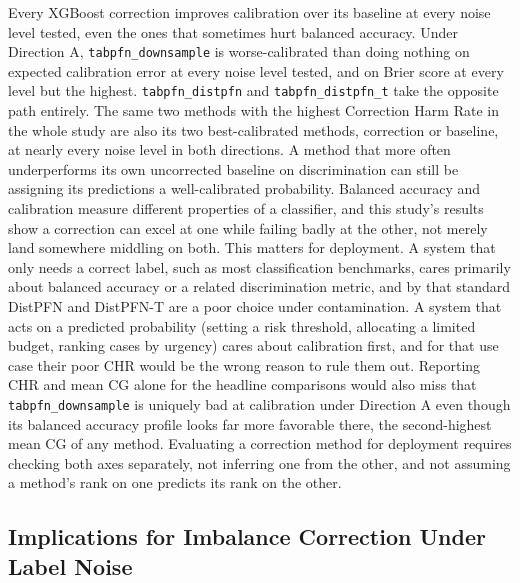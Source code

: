 Every XGBoost correction improves calibration over its baseline at every
noise level tested, even the ones that sometimes hurt balanced accuracy.
Under Direction A, \texttt{tabpfn\_downsample} is worse-calibrated than
doing nothing on expected calibration error at every noise level tested,
and on Brier score at every level but the highest.
\texttt{tabpfn\_distpfn} and
\texttt{tabpfn\_distpfn\_t} take the opposite path entirely. The same two
methods with the highest Correction Harm Rate in the whole study are also
its two best-calibrated methods, correction or baseline, at nearly every
noise level in both directions. A method that more often underperforms
its own uncorrected baseline on discrimination can still be assigning its
predictions a well-calibrated probability. Balanced accuracy and
calibration measure different
properties of a classifier, and this study's results show a correction
can excel at one while failing badly at the other, not merely land
somewhere middling on both. This matters for deployment. A system that
only needs a correct label, such as most classification benchmarks,
cares primarily about balanced accuracy or a related discrimination
metric, and by that standard DistPFN and DistPFN-T are a poor choice
under contamination. A system that acts on a predicted probability
(setting a risk threshold, allocating a limited budget, ranking cases by
urgency) cares about calibration first, and for that use case their poor
CHR would be the wrong reason to rule them out. Reporting CHR and mean CG
alone for the headline comparisons would also miss that
\texttt{tabpfn\_downsample} is uniquely bad at calibration under
Direction A even though its balanced accuracy profile looks far more
favorable there, the second-highest mean CG of any method. Evaluating a
correction method for deployment requires checking both axes separately,
not inferring one from the other, and not assuming a method's rank on one
predicts its rank on the other.

\subsection{Implications for Imbalance Correction Under Label Noise}
\label{sec:discussion-implications}

